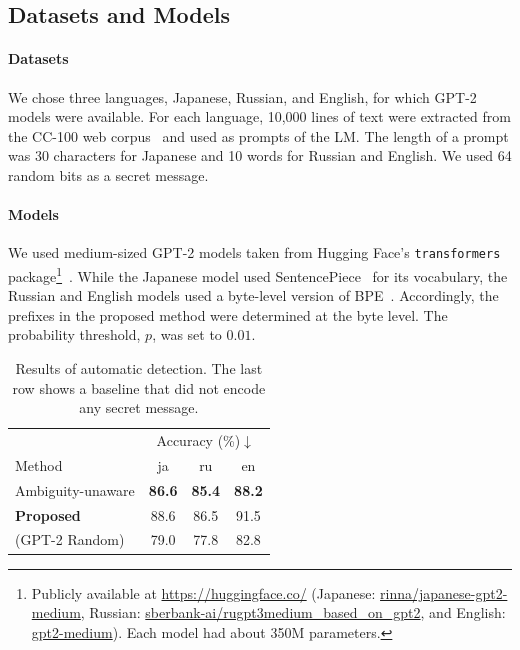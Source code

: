 \documentclass[11pt]{article}
\begin{document}
\subsection{Datasets and Models}

\paragraph{Datasets}
We chose three languages, Japanese, Russian, and English, for which GPT-2 models were available.
For each language, 10,000 lines of text were extracted from the CC-100 web corpus~\citep{wenzek-etal-2020-ccnet} and used as prompts of the LM.
The length of a prompt was 30 characters for Japanese and 10 words for Russian and English.
We used 64 random bits as a secret message.

\paragraph{Models}
We used medium-sized GPT-2 models taken from Hugging Face’s \texttt{transformers} package\footnote{Publicly available at \url{https://huggingface.co/} (Japanese: \href{https://huggingface.co/rinna/japanese-gpt2-medium}{rinna/japanese-gpt2-medium}, Russian: \href{https://huggingface.co/sberbank-ai/rugpt3medium\_based\_on\_gpt2}{sberbank-ai/rugpt3medium\_based\_on\_gpt2}, and English: \href{https://huggingface.co/gpt2-medium}{gpt2-medium}).
Each model had about 350M parameters.}~\citep{wolf-etal-2020-transformers}.
While the Japanese model used SentencePiece~\citep{kudo-richardson-2018-sentencepiece} for its vocabulary, the Russian and English models used a byte-level version of BPE~\citep{radford2019language}.
Accordingly, the prefixes in the proposed method were determined at the byte level.
The probability threshold, $p$, was set to $0.01$.


\begin{table}[t]
\centering
\begin{tabular}{l|c|c|c}
\hline
& \multicolumn{3}{c}{Accuracy (\%)$\downarrow$} \\
Method & ja & ru & en \\
\hline
Ambiguity-unaware & \textbf{86.6} & \textbf{85.4} & \textbf{88.2}  \\
\textbf{Proposed} & 88.6 & 86.5 & 91.5 \\
\hline
(GPT-2 Random) & 79.0 & 77.8 & 82.8 \\
\hline
\end{tabular}
\caption{Results of automatic detection.
The last row shows a baseline that did not encode any secret message.
}
\label{tab:automatic-detection}
\end{table}
\end{document}
